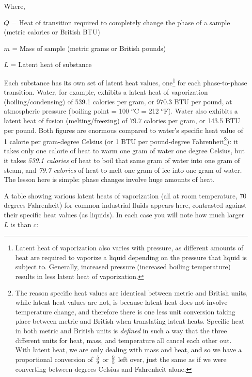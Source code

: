\noindent
Where,

$Q$ = Heat of transition required to completely change the phase of a sample (metric calories or British BTU)

$m$ = Mass of sample (metric grams or British pounds)

$L$ = Latent heat of substance

\vskip 10pt

Each substance has its own set of latent heat values, one\footnote{Latent heat of vaporization also varies with pressure, as different amounts of heat are required to vaporize a liquid depending on the pressure that liquid is subject to.  Generally, increased pressure (increased boiling temperature) results in less latent heat of vaporization.} for each phase-to-phase transition.  Water, for example, exhibits a latent heat of vaporization (boiling/condensing) of 539.1 calories per gram, or 970.3 BTU per pound, at atmospheric pressure (boiling point = 100 $^{o}$C = 212 $^{o}$F).  Water also exhibits a latent heat of fusion (melting/freezing) of 79.7 calories per gram, or 143.5 BTU per pound.  Both figures are enormous compared to water's specific heat value of 1 calorie per gram-degree Celsius (or 1 BTU per pound-degree Fahrenheit\footnote{The reason specific heat values are identical between metric and British units, while latent heat values are not, is because latent heat does not involve temperature change, and therefore there is one less unit conversion taking place between metric and British when translating latent heats.  Specific heat in both metric and British units is \textit{defined} in such a way that the three different units for heat, mass, and temperature all cancel each other out.  With latent heat, we are only dealing with mass and heat, and so we have a proportional conversion of $5 \over 9$ or $9 \over 5$ left over, just the same as if we were converting between degrees Celsius and Fahrenheit alone.}): it takes only one calorie of heat to warm one gram of water one degree Celsius, but it takes \textit{539.1 calories} of heat to boil that same gram of water into one gram of steam, and \textit{79.7 calories} of heat to melt one gram of ice into one gram of water.  The lesson here is simple: phase changes involve huge amounts of heat.    

A table showing various latent heats of vaporization (all at room temperature, 70 degrees Fahrenheit) for common industrial fluids appears here, contrasted against their specific heat values (as liquids).  In each case you will note how much larger $L$ is than $c$:

